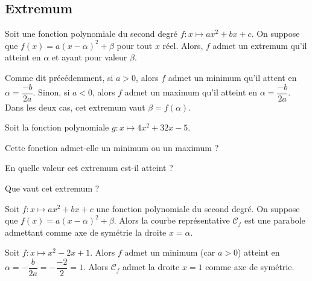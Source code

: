 \documentclass{article}
\begin{document}
\subsection{Extremum}
\begin{tcolorbox}    
\begin{proposition}
Soit une fonction polynomiale du second degré $f : x \mapsto ax^2 + bx + c$. On suppose que $f(x) = a(x - \alpha)^2 + \beta$ pour tout $x$ réel. Alors, $f$ admet un extremum qu'il atteint en $\alpha$ et ayant pour valeur $\beta$.    
\end{proposition}
\end{tcolorbox}
    \begin{remark}
Comme dit précédemment, si $a > 0$, alors $f$ admet un minimum qu'il attent en $\alpha = \dfrac{-b}{2a}$. Sinon, si $a < 0$, alors $f$ admet un maximum qu'il atteint en $\alpha = \dfrac{-b}{2a}$. Dans les deux cas, cet extremum vaut $\beta = f(\alpha)$.
\end{remark}
\begin{example}
Soit la fonction polynomiale $g : x \mapsto 4x^2 + 32x - 5$.
\begin{enumquestions}
\item Cette fonction admet-elle un minimum ou un maximum ?
\item En quelle valeur cet extremum est-il atteint ?
\item Que vaut cet extremum ?
\end{enumquestions}
\emptybox{5cm}
\end{example}
\begin{proposition}
Soit $f : x \mapsto ax^2 + bx + c$ une fonction polynomiale du second degré. On suppose que $f(x) = a(x - \alpha)^2 + \beta$. Alors la courbe représentative $\mathcal{C}_f$ est une parabole admettant comme axe de symétrie la droite $x = \alpha$.
\end{proposition}
\begin{example}
Soit $f : x \mapsto x^2 - 2x + 1$. Alors $f$ admet un minimum (car $a > 0$) atteint en $\alpha = - \dfrac{b}{2a} = - \dfrac{-2}{2} = 1$. Alors $\mathcal{C}_f$ admet la droite $x = 1$ comme axe de symétrie.
\begin{center}
\end{center}
\end{example}
\end{document}
